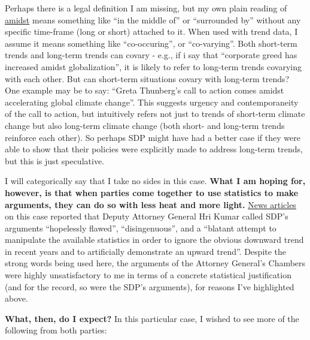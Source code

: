 \documentclass[
  openany]{book}
\begin{document}
Perhaps there is a legal definition I am missing, but my own plain reading of \href{https://www.dictionary.com/browse/amidst}{amidst} means something like ``in the middle of'' or ``surrounded by'' without any specific time-frame (long or short) attached to it. When used with trend data, I assume it means something like ``co-occuring'', or ``co-varying''. Both short-term trends and long-term trends can covary - e.g., if i say that ``corporate greed has increased amidst globalization'', it is likely to refer to long-term trends covarying with each other. But can short-term situations covary with long-term trends? One example may be to say: ``Greta Thunberg's call to action comes amidst accelerating global climate change''. This suggests urgency and contemporaneity of the call to action, but intuitively refers not just to trends of short-term climate change but also long-term climate change (both short- and long-term trends reinforce each other). So perhaps SDP might have had a better case if they were able to show that their policies were explicitly made to address long-term trends, but this is just speculative.

I will categorically say that I take no sides in this case. \textbf{What I am hoping for, however, is that when parties come together to use statistics to make arguments, they can do so with less heat and more light.} \href{https://www.todayonline.com/singapore/sdps-arguments-defence-statements-pmet-jobs-hopelessly-flawed-agc}{News articles} on this case reported that Deputy Attorney General Hri Kumar called SDP's arguments ``hopelessly flawed'', ``disingenuous'', and a ``blatant attempt to manipulate the available statistics in order to ignore the obvious downward trend in recent years and to artificially demonstrate an upward trend''. Despite the strong words being used here, the arguments of the Attorney General's Chambers were highly unsatisfactory to me in terms of a concrete statistical justification (and for the record, so were the SDP's arguments), for reasons I've highlighted above.

\textbf{What, then, do I expect?} In this particular case, I wished to see more of the following from both parties:
\end{document}
